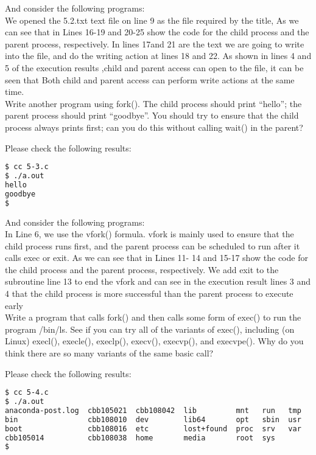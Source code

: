 \documentclass[10pt, answers]{exam}
\begin{document}
\begin{questions}
And consider the following programs:\\


We opened the 5.2.txt text file on line 9 as the file required by the title, As we can see that in Lines 16-19 and 20-25 show the code for the child process and the parent process, respectively. In lines 17and 21 are the text we are going to write into the file, and do the writing action at lines 18 and 22. As shown in lines 4 and 5 of the execution results ,child and parent access can open to the file, it can be seen that Both child and parent access can perform write actions at the same time.
\\



\question
Write another program using fork(). The child process should print “hello”; the parent process should print “goodbye”. You should try to ensure that the child process always prints first; can you do this without calling wait() in the parent?
\begin{solution}
Please check the following results:
\begin{lstlisting}[language=bash]
$ cc 5-3.c
$ ./a.out
hello
goodbye
$
\end{lstlisting}
\end{solution}

And consider the following programs:\\


In Line 6, we use the vfork() formula. vfork is mainly used to ensure that the child process runs first, and the parent process can be scheduled to run after it calls exec or exit. As we can see that in Lines 11- 14 and 15-17 show the code for the child process and the parent process, respectively. We add exit to the subroutine line 13 to end the vfork and can see in the execution result lines 3 and 4 that the child process is more successful than the parent process to execute early
\\


\question
Write a program that calls fork() and then calls some form of exec() to run the program /bin/ls. See if you can try all of the variants of exec(), including (on Linux) execl(), execle(), execlp(), execv(), execvp(), and execvpe(). Why do you think there are so many variants of the same basic call?

\begin{solution}
Please check the following results:
\begin{lstlisting}[language=bash]
$ cc 5-4.c
$ ./a.out
anaconda-post.log  cbb105021  cbb108042  lib         mnt   run   tmp
bin                cbb108010  dev        lib64       opt   sbin  usr
boot               cbb108016  etc        lost+found  proc  srv   var
cbb105014          cbb108038  home       media       root  sys
$
\end{lstlisting}
\end{solution}



\end{questions}
\end{document}
